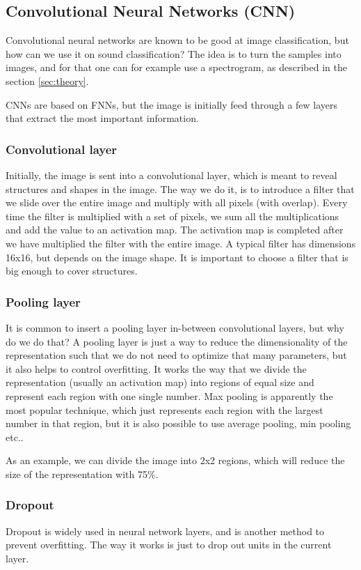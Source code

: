\subsection{Convolutional Neural Networks (CNN)}
Convolutional neural networks are known to be good at image classification, but how can we use it on sound classification? The idea is to turn the samples into images, and for that one can for example use a spectrogram, as described in the section \ref{sec:theory}. 

CNNs are based on FNNs, but the image is initially feed through a few layers that extract the most important information. 

\subsubsection*{Convolutional layer}
Initially, the image is sent into a convolutional layer, which is meant to reveal structures and shapes in the image. The way we do it, is to introduce a filter that we slide over the entire image and multiply with all pixels (with overlap). Every time the filter is multiplied with a set of pixels, we sum all the multiplications and add the value to an activation map. The activation map is completed after we have multiplied the filter with the entire image. A typical filter has dimensions 16x16, but depends on the image shape. It is important to choose a filter that is big enough to cover structures. 

\subsubsection*{Pooling layer}
It is common to insert a pooling layer in-between convolutional layers, but why do we do that? A pooling layer is just a way to reduce the dimensionality of the representation such that we do not need to optimize that many parameters, but it also helps to control overfitting. It works the way that we divide the representation (usually an activation map) into regions of equal size and represent each region with one single number. Max pooling is apparently the most popular technique, which just represents each region with the largest number in that region, but it is also possible to use average pooling, min pooling etc.. \cite{pooling}

As an example, we can divide the image into 2x2 regions, which will reduce the size of the representation with 75\%. 

\subsubsection*{Dropout}
Dropout is widely used in neural network layers, and is another method to prevent overfitting. The way it works is just to drop out units in the current layer.


